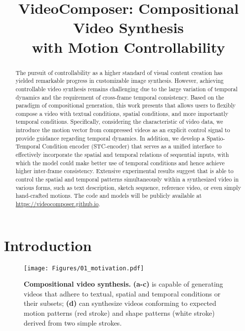 \title{VideoComposer: Compositional Video Synthesis \\ with Motion Controllability}



\maketitle

\begin{abstract}

The pursuit of controllability as a higher standard of visual content creation has yielded remarkable progress in customizable image synthesis.
However, achieving controllable video synthesis remains challenging due to the large variation of temporal dynamics and the requirement of cross-frame temporal consistency.
Based on the paradigm of compositional generation, this work presents \method that allows users to flexibly compose a video with textual conditions, spatial conditions, and more importantly temporal conditions.
Specifically, considering the characteristic of video data, we introduce the motion vector from compressed videos as an explicit control signal to provide guidance regarding temporal dynamics.
In addition, we develop a Spatio-Temporal Condition encoder (STC-encoder) that serves as a unified interface to effectively incorporate the spatial and temporal relations of sequential inputs, with which the model could make better use of temporal conditions and hence achieve higher inter-frame consistency.
Extensive experimental results suggest that \method is able to control the spatial and temporal patterns simultaneously within a synthesized video in various forms, such as text description, sketch sequence, reference video, or even simply hand-crafted motions.
The code and models will be publicly available at \url{https://videocomposer.github.io}.

\end{abstract}
\section{Introduction}

\begin{figure}
    \centering
    \texttt{[image: Figures/01\_motivation.pdf]}
    \vspace{-1em}
    \caption{
        \textbf{Compositional video synthesis.}
        \textbf{(a-c)} \method is capable of generating videos that adhere to textual, spatial and temporal conditions or their subsets; 
        \textbf{(d)} \method can synthesize videos conforming to expected motion patterns (red stroke) and shape patterns (white stroke) derived from two simple strokes. 
        }
    \label{fig:teaser}
    \vspace{-2em}
\end{figure}

